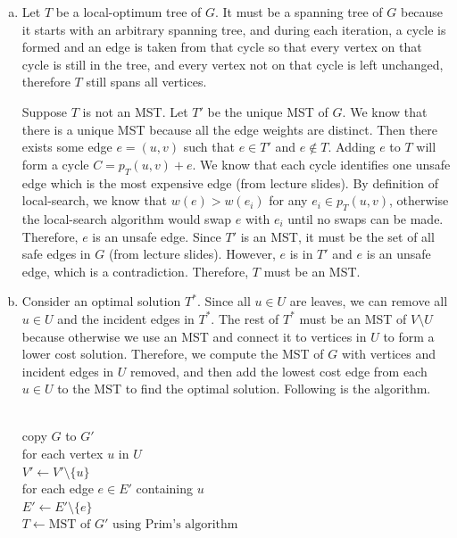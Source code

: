 \documentclass[11pt]{article}
\begin{document}



\begin{solution}
\begin{enumerate}[(a)]
\item Let $T$ be a local-optimum tree of $G$. It must be a spanning tree of $G$ because it starts with an arbitrary spanning tree, and during each iteration, a cycle is formed and an edge is taken from that cycle so that every vertex on that cycle is still in the tree, and every vertex not on that cycle is left unchanged, therefore $T$ still spans all vertices.

Suppose $T$ is not an MST. Let $T'$ be the unique MST of $G$. We know that there is a unique MST because all the edge weights are distinct. Then there exists some edge $e=(u, v)$ such that $e\in T'$ and $e\notin T$. Adding $e$ to $T$ will form a cycle $C=p_T(u, v)+e$. We know that each cycle identifies one unsafe edge which is the most expensive edge (from lecture slides). By definition of local-search, we know that $w(e)>w(e_i)$ for any $e_i\in p_T(u, v)$, otherwise the local-search algorithm would swap $e$ with $e_i$ until no swaps can be made. Therefore, $e$ is an unsafe edge. Since $T'$ is an MST, it must be the set of all safe edges in $G$ (from lecture slides). However, $e$ is in $T'$ and $e$ is an unsafe edge, which is a contradiction. Therefore, $T$ must be an MST.
\item Consider an optimal solution $T^*$. Since all $u\in U$ are leaves, we can remove all $u\in U$ and the incident edges in $T^*$. The rest of $T^*$ must be an MST of $V\setminus U$ because otherwise we use an MST and connect it to vertices in $U$ to form a lower cost solution. Therefore, we compute the MST of $G$ with vertices and incident edges in $U$ removed, and then add the lowest cost edge from each $u\in U$ to the MST to find the optimal solution. Following is the algorithm.
\begin{algo}
	\textsc{}\+
\\	copy $G$ to $G'$
\\	for each vertex $u$ in $U$\+
\\	$V'\gets V'\setminus \{u\}$
\\	for each edge $e\in E'$ containing $u$\+
\\	$E'\gets E'\setminus \{e\}$\-\-
\\	$T\gets \text{MST of $G'$ using Prim's algorithm}$

\end{algo}
\end{enumerate}
\end{solution}
\end{document}

